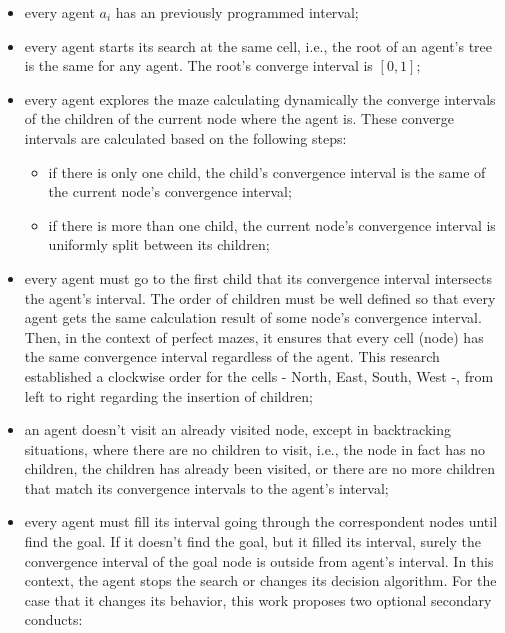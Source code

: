 \begin{itemize}
\item every agent $a_{i}$ has an previously programmed interval;

\item every agent starts its search at the same cell, i.e., the root of an agent's tree is the same for any agent. The root's converge interval is $[0,1]$;

\item every agent explores the maze calculating dynamically the converge intervals of the children of the current node where the agent is. These converge intervals are calculated based on the following steps:

	\begin{itemize}

	\item if there is only one child, the child's convergence interval is the same of the current node's convergence interval;
	
	\item if there is more than one child, the current node's convergence interval is uniformly split between its children;
	
	\end{itemize}
	
\item every agent must go to the first child that its convergence interval intersects the agent's interval. The order of children must be well defined so that every agent gets the same calculation result of some node's convergence interval. Then, in the context of perfect mazes, it ensures that every cell (node) has the same convergence interval regardless of the agent. This research established a clockwise order for the cells - North, East, South, West -, from left to right regarding the insertion of children;

\item an agent doesn't visit an already visited node, except in backtracking situations, where there are no children to visit, i.e., the node in fact has no children, the children has already been visited, or there are no more children that match its convergence intervals to the agent's interval;

\item every agent must fill its interval going through the correspondent nodes until find the goal. If it doesn't find the goal, but it filled its interval, surely the convergence interval of the goal node is outside from agent's interval. In this context, the agent stops the search or changes its decision algorithm. For the case that it changes its behavior, this work proposes two optional secondary conducts:


\end{itemize}
